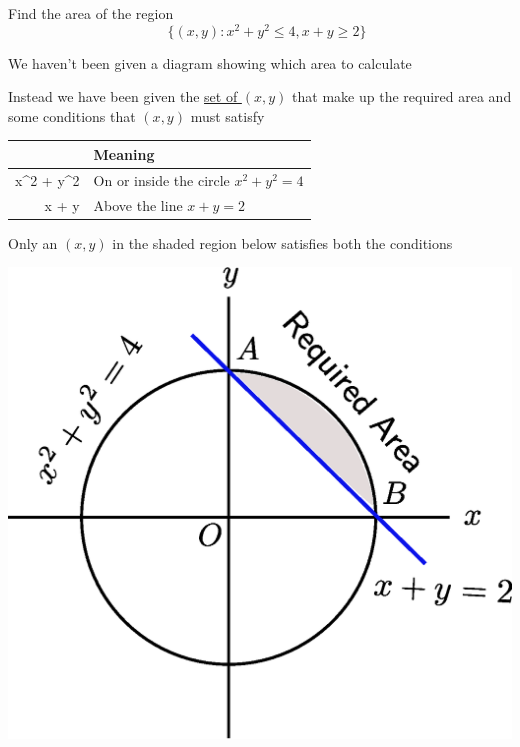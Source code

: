 \documentclass[14pt,fleqn]{extarticle}
\begin{document}
Find the area of the region 
%
\[ \quad \lbrace (x,y): x^2+y^2\leq 4, x + y\geq 2 \rbrace \]

\newcard

We haven't been given a diagram showing which area to calculate\newline 

Instead we have been given the \underline{set of $(x,y)$} that make up the required area and some conditions that $(x,y)$ must satisfy 

\begin{center}
  \begin{tabular}{Nl}
  \toprule 
         & Meaning \\
   \midrule 
     x^2 + y^2  &  On or inside the circle $x^2+y^2 = 4$ \\
    \midrule 
    x + y  & Above the line $x+y = 2$ \\
    \bottomrule
  \end{tabular}
\end{center}

Only an $(x,y)$ in the shaded region below satisfies both the conditions 

\begin{center}
\includegraphics[scale=0.35]{right.eps}
\end{center}
%

\newcard
\end{document}
